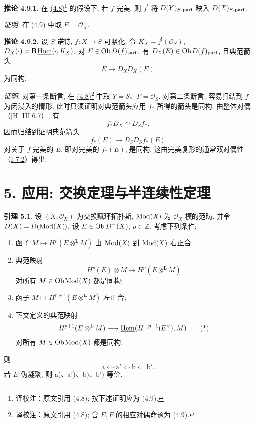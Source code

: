 \textbf{推论 4.9.1.} 在 \hyperlink{sga6.e03.prop.4-8}{(4.8)}\footnote{译校注：原文引用 (4.8); 按下述证明应为 (4.9).} 的假设下, 若 \(f\) 完美, 则 \(f^!\) 将 \(D(Y)_{S\text{-}\mathrm{parf}}\) 映入 \(D(X)_{S\text{-}\mathrm{parf}}\).

\emph{证明.} 在 \hyperlink{sga6.e03.prop.4-9}{(4.9)} 中取 \(E=\mathcal O_X\).

\textbf{推论 4.9.2.} 设 \(S\) 诺特, \(f:X\to S\) 可紧化. 令 \(K_X=f^!(\mathcal O_S)\), \(D_X(\cdot)=\mathbf R\underline{\operatorname{Hom}}(\cdot,K_X)\). 对 \(E\in\operatorname{Ob} D(f)_{\mathrm{parf}}\), 有 \(D_X(E)\in\operatorname{Ob} D(f)_{\mathrm{parf}}\), 且典范箭头
\[
 E\longrightarrow D_XD_X(E)
\]
为同构.

\emph{证明.} 对第一条断言, 在 \hyperlink{sga6.e03.prop.4-8}{(4.8)}\footnote{译校注：原文引用 (4.8); 含 $E,F$ 的相应对偶命题为 (4.9).} 中取 \(Y=S\)、\(F=\mathcal O_S\). 对第二条断言, 容易归结到 \(f\) 为闭浸入的情形. 此时只须证明对典范箭头应用 \(f_*\) 所得的箭头是同构. 由整体对偶（[H] III 6.7）, 有
\[
f_*D_X\simeq D_Sf_*.
\]
因而归结到证明典范箭头
\[
f_*(E)\longrightarrow D_SD_Sf_*(E)
\]
对关于 \(f\) 完美的 \(E\), 即对完美的 \(f_*(E)\), 是同构. 这由完美复形的通常双对偶性（\hyperlink{sga6.e01.prop.7-2}{I 7.2}）得出.

\section*{5. 应用: 交换定理与半连续性定理\protect\footnotemark}

\textbf{引理 5.1.} 设 \((X,\mathcal O_X)\) 为交换赋环拓扑斯, \(\operatorname{Mod}(X)\) 为 \(\mathcal O_X\)-模的范畴, 并令 \(D(X)=D(\operatorname{Mod}(X))\). 设 \(E\in\operatorname{Ob} D^{-}(X)\), \(p\in\mathbb Z\). 考虑下列条件:
\begin{enumerate}[label=\alph*)]
\item 函子 \(M\mapsto H^p(E\otimes^{\mathbf L}M)\) 由 \(\operatorname{Mod}(X)\) 到 \(\operatorname{Mod}(X)\) 右正合;
\item[\(\mathrm a'\)] 典范映射
\[
 H^p(E)\otimes M\longrightarrow H^p(E\otimes^{\mathbf L}M)
\]
对所有 \(M\in\operatorname{Ob}\operatorname{Mod}(X)\) 都是同构;
\item[\(\mathrm b\)] 函子 \(M\mapsto H^{p+1}(E\otimes^{\mathbf L}M)\) 左正合;
\item[\(\mathrm b'\)] 下文定义的典范映射
\[
 H^{p+1}(E\otimes^{\mathbf L}M)
 \longrightarrow
 \underline{\operatorname{Hom}}(H^{-p-1}(E^{\vee}),M)\tag{*}
\]
对所有 \(M\in\operatorname{Ob}\operatorname{Mod}(X)\) 都是同构.
\end{enumerate}
则
\[
 \mathrm a\Longleftrightarrow \mathrm a'
 \Longleftrightarrow \mathrm b
 \Longleftarrow \mathrm b'.
\]
若 \(E\) 伪凝聚, 则 a)、a')、b)、b') 等价.

